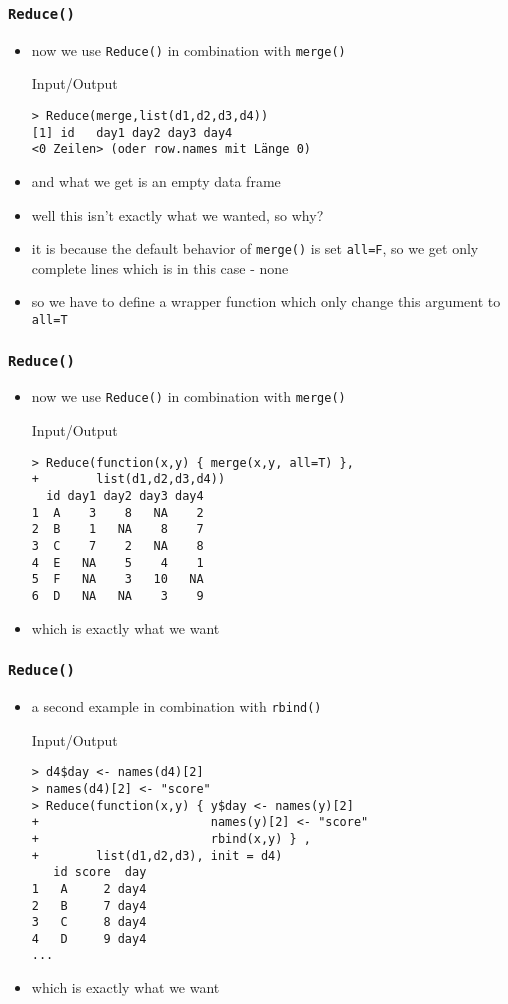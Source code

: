 \documentclass[xcolor={table},c]{beamer}
\begin{document}
\begin{frame}[fragile]\frametitle{\texttt{Reduce()}}
  \begin{itemize}
  \item now we use \texttt{Reduce()} in combination with \texttt{merge()}
  \begin{exampleblock}{Input/Output}\tiny
\begin{verbatim}
> Reduce(merge,list(d1,d2,d3,d4))
[1] id   day1 day2 day3 day4
<0 Zeilen> (oder row.names mit Länge 0)
\end{verbatim}
  \end{exampleblock}
\item and what we get is an empty data frame
\item well this isn't exactly what we wanted, so why?
\item it is because the default behavior of \texttt{merge()} is set \texttt{all=F}, so we get only complete lines which is in this case - none
\item so we have to define a wrapper function which only change this argument to \texttt{all=T}
  \end{itemize}

\end{frame}


\begin{frame}[fragile]\frametitle{\texttt{Reduce()}}
  \begin{itemize}
  \item now we use \texttt{Reduce()} in combination with \texttt{merge()}
  \begin{exampleblock}{Input/Output}\small
\begin{verbatim}
> Reduce(function(x,y) { merge(x,y, all=T) },
+        list(d1,d2,d3,d4))
  id day1 day2 day3 day4
1  A    3    8   NA    2
2  B    1   NA    8    7
3  C    7    2   NA    8
4  E   NA    5    4    1
5  F   NA    3   10   NA
6  D   NA   NA    3    9
\end{verbatim}
  \end{exampleblock}
\item which is exactly what we want
  \end{itemize}
\end{frame}

\begin{frame}[fragile]\frametitle{\texttt{Reduce()}}
  \begin{itemize}
  \item a second example in combination with \texttt{rbind()}
  \begin{exampleblock}{Input/Output}\small
\begin{verbatim}
> d4$day <- names(d4)[2]
> names(d4)[2] <- "score"
> Reduce(function(x,y) { y$day <- names(y)[2]
+                        names(y)[2] <- "score"
+                        rbind(x,y) } ,
+        list(d1,d2,d3), init = d4)
   id score  day
1   A     2 day4
2   B     7 day4
3   C     8 day4
4   D     9 day4
...
\end{verbatim}
  \end{exampleblock}
\item which is exactly what we want
  \end{itemize}
\end{frame}
\end{document}
